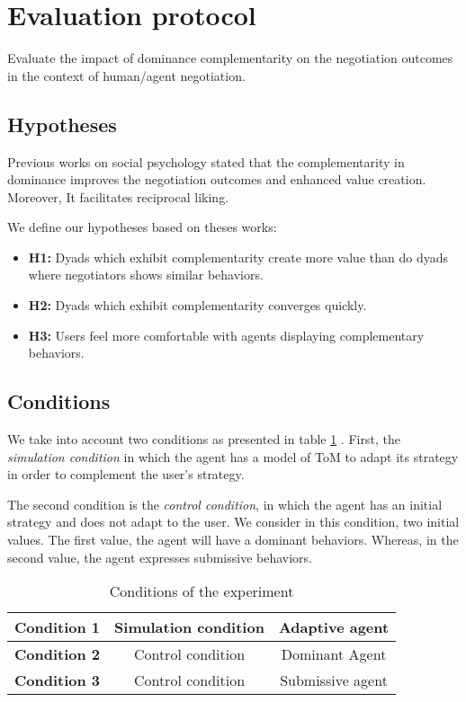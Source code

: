 \documentclass {article}
\begin{document}
		\section{Evaluation protocol}
		Evaluate the impact of dominance complementarity on the negotiation outcomes in the context of human/agent negotiation.
		
		\subsection{Hypotheses}
		Previous works on social psychology  stated that the complementarity in dominance improves the negotiation outcomes and enhanced value creation.
		Moreover, It facilitates reciprocal liking. 
		
		We define our hypotheses based on theses works:
		\begin{itemize}
			\item \textbf{H1:} Dyads which exhibit complementarity create more value than do dyads where negotiators shows similar behaviors.
			\item \textbf{H2:} Dyads which exhibit complementarity converges quickly.
			\item \textbf{H3:} Users feel more comfortable with agents displaying complementary behaviors. 

		\end{itemize}
		
		
		
	\subsection{Conditions}
	We take into account two conditions as presented in table \ref{tab:cond} . First, the \textit{simulation condition} in which the agent has a model of ToM to adapt its strategy in order to complement the user's strategy. 
	
	The second condition is the \textit{control condition}, in which the agent has an initial strategy and does not adapt to the user.
	We consider in this condition, two initial values. The first value, the agent will have a dominant behaviors. Whereas, in the second value, the agent expresses submissive behaviors.
	
	\begin{table}[h]
		\centering
		\caption{Conditions of the experiment}
		\label{tab:cond}
		\begin{tabular} {|c|c|c|}
			\hline
			\textbf{Condition 1} & Simulation condition & Adaptive agent \\
			\hline
			\textbf{Condition 2} & Control condition & Dominant Agent \\
			\hline
			 \textbf{Condition 3} & Control condition & Submissive agent \\
			\hline
			
		\end{tabular}
	\end{table}
	
\end{document}
